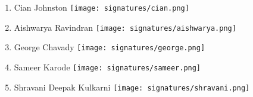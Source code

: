\documentclass[a4paper,10pt]{article}
\begin{document}
\begin{enumerate}
    \item{
        Cian Johnston \texttt{[image: signatures/cian.png]}
    }
    \item{
        Aishwarya Ravindran \texttt{[image: signatures/aishwarya.png]}
    }
    \item{
        George Chavady \texttt{[image: signatures/george.png]}
    }
    \item{
        Sameer Karode \texttt{[image: signatures/sameer.png]}
    }
    \item{
        Shravani Deepak Kulkarni \texttt{[image: signatures/shravani.png]}
    }

\end{enumerate}
\end{document}
